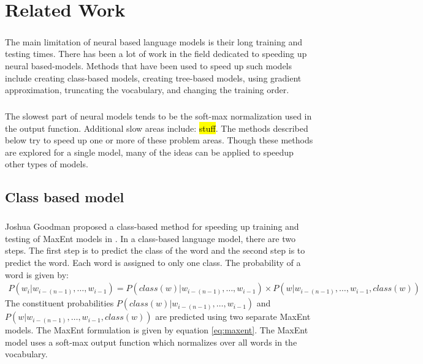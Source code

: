 \documentclass[12pt]{ociamthesis}
\begin{document}
\chapter{Related Work}
\paragraph{}
The main limitation of neural based language models is their long training and testing times. There has been a lot of work in the field dedicated to speeding up neural based-models. Methods that have been used to speed up such models include creating class-based models, creating tree-based models, using gradient approximation, truncating the vocabulary, and changing the training order.
\paragraph{}
The slowest part of neural models tends to be the soft-max normalization used in the output function. Additional slow areas include: \hl{stuff}.
The methods described below try to speed up one or more of these problem areas. Though these methods are explored for a single model, many of the ideas can be applied to speedup other types of models.
\section{Class based model}
\paragraph{}
Joshua Goodman proposed a class-based method for speeding up training and testing of MaxEnt models in \cite{Goodman2001}. In a class-based language model, there are two steps. The first step is to predict the class of the word and the second step is to predict the word. Each word is assigned to only one class. 
The probability of a word is given by:
\begin{align}
P(w_i | w_{i-(n-1)},\dots, w_{i-1})  =  P(class(w) | w_{i-(n-1)},\dots, w_{i-1}) \times P(w|  w_{i-(n-1)},\dots, w_{i-1}, class(w))
\end{align}
The constituent probabilities $P(class(w) | w_{i-(n-1)},\dots, w_{i-1})$ and $P(w|  w_{i-(n-1)},\dots, w_{i-1}, class(w))$ are predicted using two separate MaxEnt models. The MaxEnt formulation is given by equation \ref{eq:maxent}. The MaxEnt model uses a soft-max output function which normalizes over all words in the vocabulary.
\end{document}
